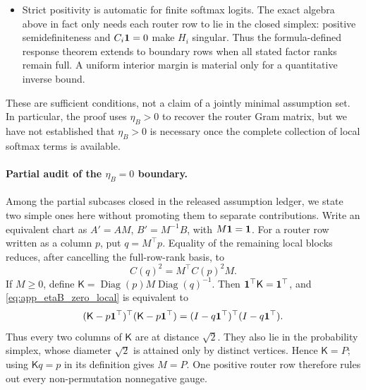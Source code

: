 \begin{itemize}
 \item Strict positivity is automatic for finite softmax logits.  The exact
 algebra above in fact only needs each router row to lie in the closed simplex:
 positive semidefiniteness and \(C_i\mathbf{1}=0\) make \(H_i\) singular.  Thus
 the formula-defined response theorem extends to boundary rows when all stated
 factor ranks remain full.  A uniform interior margin is material only for a
 quantitative inverse bound.
\end{itemize}
These are sufficient conditions, not a claim of a jointly minimal assumption
set.  In particular, the proof uses \(\eta_B>0\) to recover the router Gram
matrix, but we have not established that \(\eta_B>0\) is necessary once the
complete collection of local softmax terms is available.

\paragraph{Partial audit of the \(\eta_B=0\) boundary.}
Among the partial subcases closed in the released assumption ledger, we state
two simple ones here without promoting them to separate contributions.  Write
an equivalent chart as
\(A'=AM\), \(B'=M^{-1}B\), with \(M\mathbf{1}=\mathbf{1}\).  For a router row written
as a column \(p\), put \(q=M^\top p\).  Equality of the remaining local blocks
reduces, after cancelling the full-row-rank basis, to
\begin{equation}
 C(q)^2=M^\top C(p)^2M.
 \label{eq:app_etaB_zero_local}
\end{equation}
If \(M\ge0\), define
\(\mathsf K=\operatorname{Diag}(p)M\operatorname{Diag}(q)^{-1}\).
Then \(\mathbf{1}^\top\mathsf K=\mathbf{1}^\top\), and
\eqref{eq:app_etaB_zero_local} is equivalent to
\[
 (\mathsf K-p\mathbf{1}^\top)^\top(\mathsf K-p\mathbf{1}^\top)
 =(I-q\mathbf{1}^\top)^\top(I-q\mathbf{1}^\top).
\]
Thus every two columns of \(\mathsf K\) are at distance \(\sqrt2\).
They also lie in the probability simplex, whose diameter \(\sqrt2\) is
attained only by distinct vertices.  Hence \(\mathsf K=P\); using
\(\mathsf Kq=p\) in its definition gives \(M=P\).  One positive router row
therefore rules out every non-permutation nonnegative gauge.

